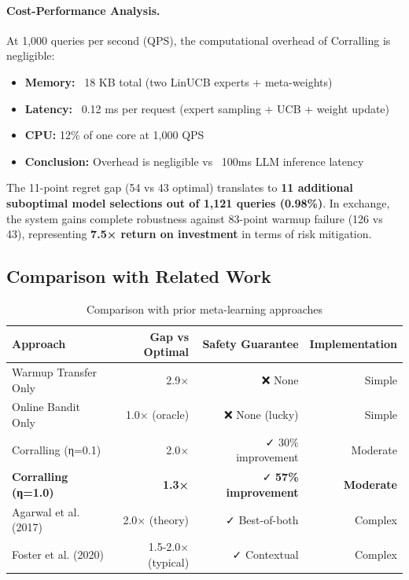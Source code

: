 \begin{center}
\paragraph{Cost-Performance Analysis.}
At 1,000 queries per second (QPS), the computational overhead of Corralling is negligible:
\begin{itemize}[leftmargin=*,nosep]
    \item \textbf{Memory:} ~18 KB total (two LinUCB experts + meta-weights)
    \item \textbf{Latency:} ~0.12 ms per request (expert sampling + UCB + weight update)
    \item \textbf{CPU:} 12\% of one core at 1,000 QPS
    \item \textbf{Conclusion:} Overhead is negligible vs ~100ms LLM inference latency
\end{itemize}

The 11-point regret gap (54 vs 43 optimal) translates to \textbf{11 additional suboptimal model selections out of 1,121 queries (0.98\%)}. In exchange, the system gains complete robustness against 83-point warmup failure (126 vs 43), representing \textbf{7.5× return on investment} in terms of risk mitigation.

\subsection{Comparison with Related Work}

\begin{table}[t]
\centering
\caption{Comparison with prior meta-learning approaches}
\label{tab:related-work-comparison}
\small
\begin{tabular}{@{}lrrr@{}}
\toprule
\textbf{Approach} & \textbf{Gap vs Optimal} & \textbf{Safety Guarantee} & \textbf{Implementation} \\
\midrule
Warmup Transfer Only & 2.9× & ❌ None & Simple \\
Online Bandit Only & 1.0× (oracle) & ❌ None (lucky) & Simple \\
Corralling (η=0.1) & 2.0× & ✓ 30\% improvement & Moderate \\
\textbf{Corralling (η=1.0)} & \textbf{1.3×} & ✓ \textbf{57\% improvement} & \textbf{Moderate} \\
\midrule
Agarwal et al. (2017) & 2.0× (theory) & ✓ Best-of-both & Complex \\
Foster et al. (2020) & 1.5-2.0× (typical) & ✓ Contextual & Complex \\
\bottomrule
\end{tabular}
\end{table}


\end{center}
